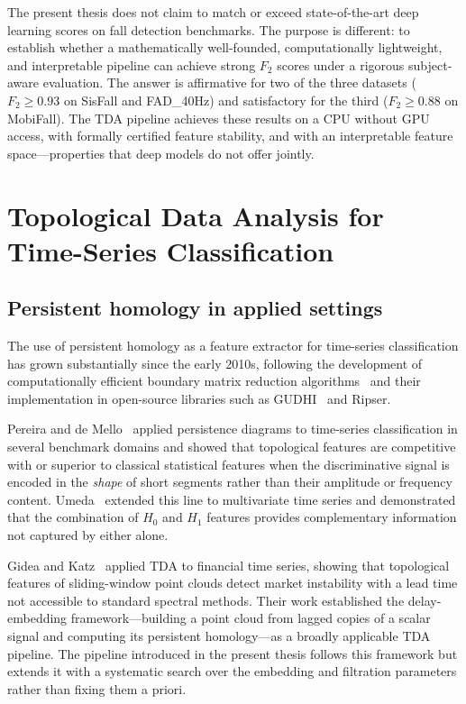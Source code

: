 The present thesis does not claim to match or exceed state-of-the-art deep learning
scores on fall detection benchmarks.  The purpose is different: to establish whether
a mathematically well-founded, computationally lightweight, and interpretable
pipeline can achieve strong $F_2$ scores under a rigorous subject-aware evaluation.
The answer is affirmative for two of the three datasets ($F_2 \geq 0.93$ on SisFall
and FAD\_40Hz) and satisfactory for the third ($F_2 \geq 0.88$ on MobiFall).  The
TDA pipeline achieves these results on a CPU without GPU access, with formally
certified feature stability, and with an interpretable feature space---properties
that deep models do not offer jointly.

\section{Topological Data Analysis for Time-Series Classification}
\label{subsec:rw-tda}

\subsection{Persistent homology in applied settings}

The use of persistent homology as a feature extractor for time-series classification
has grown substantially since the early 2010s, following the development of
computationally efficient boundary matrix reduction
algorithms~\parencite{edelsbrunner2002topological} and their implementation in
open-source libraries such as GUDHI~\parencite{gudhi} and Ripser.

Pereira and de Mello~\parencite{pereira2015persistent} applied persistence diagrams to
time-series classification in several benchmark domains and showed that topological
features are competitive with or superior to classical statistical features when the
discriminative signal is encoded in the \emph{shape} of short segments rather than
their amplitude or frequency content.  Umeda~\parencite{umeda2017time} extended this line
to multivariate time series and demonstrated that the combination of $H_0$ and $H_1$
features provides complementary information not captured by either alone.

Gidea and Katz~\parencite{gidea2018topological} applied TDA to financial time series,
showing that topological features of sliding-window point clouds detect market
instability with a lead time not accessible to standard spectral methods.  Their
work established the delay-embedding framework---building a point cloud from lagged
copies of a scalar signal and computing its persistent homology---as a broadly
applicable TDA pipeline.  The pipeline introduced in the present thesis follows
this framework but extends it with a systematic search over the embedding and
filtration parameters rather than fixing them a priori.

